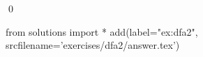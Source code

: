 
\begin{ex} 
  \label{ex:dfa2}
  
  \qed
\end{ex} 
\begin{python0}
from solutions import *
add(label="ex:dfa2",
    srcfilename='exercises/dfa2/answer.tex') 
\end{python0}

